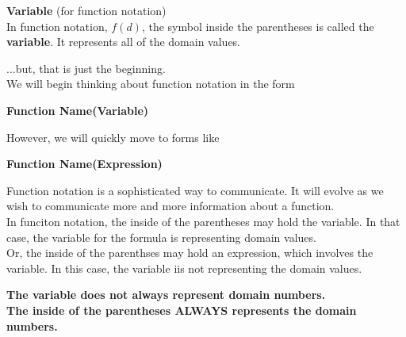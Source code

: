 \documentclass{ximera}
\begin{document}
\begin{definition}  \textbf{\textcolor{green!50!black}{Variable}} (for function notation) \\ 


In function notation, $f(d)$, the symbol inside the parentheses is called the \textbf{variable}. It represents all of the domain values.

\end{definition}



...but, that is just the beginning. \\









We will begin thinking about function notation in the form 

\begin{center}

\textbf{\textcolor{red!80!black}{Function Name(Variable)}}

\end{center}


However, we will quickly move to forms like


\begin{center}

\textbf{\textcolor{red!80!black}{Function Name(Expression)}}

\end{center}




Function notation is a sophisticated way to communicate.  It will evolve as we wish to communicate more and more information about a function. \\

In funciton notation, the inside of the parentheses may hold the variable.  In that case, the variable for the formula is representing domain values. \\

Or, the inside of the parenthses may hold an expression, which involves the variable.  In this case, the variable iis not representing the domain values. \\


 
\begin{center}

\textbf{\textcolor{blue!55!black}{The variable does not always represent domain numbers.}} \\

\textbf{\textcolor{purple!85!blue}{The inside of the parentheses ALWAYS represents the domain numbers.}}


\end{center}
\end{document}
